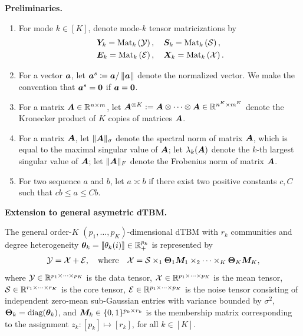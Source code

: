 \documentclass[journal]{IEEEtran}
\theoremstyle{definition}
\theoremstyle{definition}
\newcommand{\of}[1]{\left(#1\right)}
\begin{document}
{\bf Preliminaries.}
\begin{enumerate}[wide]
    \item For mode $ k \in [K]$, denote mode-$k$ tensor matricizations by
    \begin{align}
        &\mY_k = \mat_k \of{ \tY }, \quad \mS_k = \mat_k \of{\tS}, \\ &\mE_k = \mat_k \of{ \tE}, \quad \mX_k = \mat_k \of{\tX}.
    \end{align}
    \item For a vector $\bm{a}$, let $\bm{a}^{s} \coloneqq \bm{a}/\left\lVert\bm{a}\right\rVert$ denote the normalized vector. We make the convention that $\bm{a}^s = {\bf 0}$ if $\bm{a} = {\bf 0}$. 
    \item For a matrix $\bm A \in \mathbb{R}^{n \times m} $, let $\bm A^{\otimes K}:=\bm A\otimes \cdots \otimes \bm A\in \mathbb{R}^{n^K \times m^K}$ denote the Kronecker product of $K$ copies of matrices $\bm A $.
    \item For a matrix $\bm A$, let $\lVert\bm A\rVert_\sigma$ denote the spectral norm of matrix $\bm A$, which is equal to the maximal singular value of $\bm A$; let $\lambda_k(\bm A)$ denote the $k$-th largest singular value of $\bm A$; let $\lVert\bm A\rVert_F$ denote the Frobenius norm of matrix $\bm A$.
    \item For two sequence $a$ and $b$, let $a \asymp b$ if there exist two positive constants $c, C$ such that $cb \leq a\leq Cb$. 
\end{enumerate}

{\bf Extension to general asymetric dTBM.} 
 
 The general order-$K$ $(p_1, \ldots, p_K)$-dimensional dTBM with $r_k$ communities and degree heterogeneity $\boldsymbol{\theta}_k = \llbracket \theta_k(i) \rrbracket \in \mathbb{R}_+^{p_k}$ is represented by
\begin{equation}\label{eq:general_dtbm}
    \tY = \tX+ \tE,\quad \text{where}\quad \tX=\tS \times_1 \mTheta_1 \mM_1 \times_2 \cdots \times_K \mTheta_K \mM_K,
\end{equation}
where $\mathcal{Y} \in \mathbb{R}^{p_1 \times \cdots \times p_K}$ is the data tensor, $\mathcal{X}\in \mathbb{R}^{p_1\times \cdots \times p_K}$ is the mean tensor, $\mathcal{S} \in \mathbb{R}^{r_1 \times \cdots \times r_K}$ is the core tensor, $\mathcal{E} \in \mathbb{R}^{p_1 \times \cdots \times p_K}$ is the noise tensor consisting of independent zero-mean sub-Gaussian entries with variance bounded by $\sigma^2$, $\boldsymbol{\Theta}_k = \text{diag}(\boldsymbol{\theta}_k)$, and $\bm M_k\in \{0,1\}^{p_k \times r_k}$ is the membership matrix corresponding to the assignment $z_k: [p_k] \mapsto [r_k]$, for all $k \in [K]$. 
\end{document}
